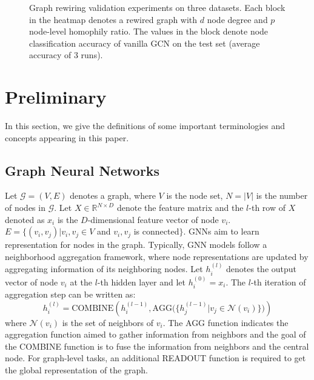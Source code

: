 \documentclass[sigconf]{acmart}
\begin{document}
	
	\begin{figure*}[h]
		\begin{minipage}[t]{0.32\linewidth}
			\centering
\end{minipage}\begin{minipage}[t]{0.32\linewidth}
			\centering
		\end{minipage}
		\begin{minipage}[t]{0.32\linewidth}
			\centering
		\end{minipage}
		\caption{Graph rewiring validation experiments on three datasets. Each block in the heatmap denotes a rewired graph with $d$ node degree and $p$ node-level homophily ratio. The values in the block denote node classification accuracy of vanilla GCN on the test set (average accuracy of 3 runs).}
		
		\label{fig:gr_valid}
	\end{figure*} \section{Preliminary}
	In this section, we give the definitions of some important terminologies and concepts appearing in this paper.
	\subsection{Graph Neural Networks}
	Let $\mathcal{G}=(V,E)$ denotes a graph, where $V$ is the node set, $N=|V|$ is the number of nodes in $\mathcal{G}$. Let $X\in \mathbb{R}^{N\times D}$ denote the feature matrix and the $l$-th row of $X$ denoted as $x_i$ is the $D$-dimensional feature vector of node $v_i$. $E=\{(v_i, v_j) | v_i, v_j \in V$ and $v_i, v_j$ is connected$\}$. GNNs aim to learn representation for nodes in the graph. Typically, GNN models follow a neighborhood aggregation framework, where node representations are updated by aggregating information of its neighboring nodes. Let $h_i^{(l)}$ denotes the output vector of node $v_i$ at the $l$-th hidden layer and let $h_i^{(0)}=x_i$. The $l$-th iteration of aggregation step can be written as:
	\begin{equation}
	\nonumber
	h_i^{(l)} = \text{COMBINE}\left(h_i^{(l-1)}, \text{AGG}\big(\{h_j^{(l-1)} | v_j \in \mathcal{N}(v_i) \}\big)\right) 
	\end{equation}
	where $\mathcal{N}(v_i)$  is the set of neighbors of $v_i$. The AGG function indicates the aggregation function aimed to gather information from neighbors and the goal of the COMBINE function is to fuse the information from neighbors and the central node. For graph-level tasks, an additional READOUT function is required to get the global representation of the graph. 
\end{document}
